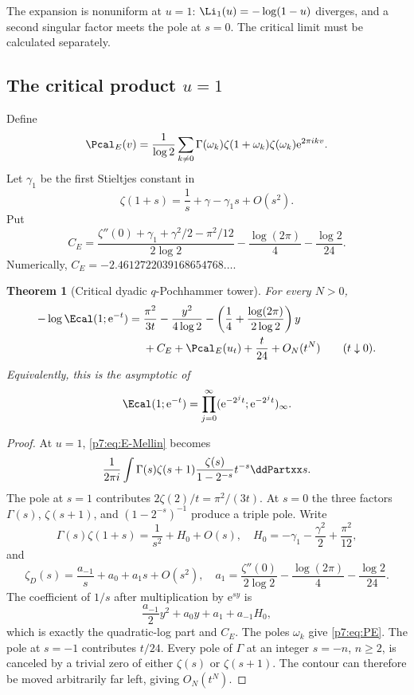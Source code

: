 \documentclass[11pt]{article}
\numberwithin{equation}{section}
\newtheorem{theorem}{Theorem}[section]
\theoremstyle{definition}
\theoremstyle{remark}
\newcommand{\e}{\mathrm e}
\begin{document}
The expansion is nonuniform at $u=1$: $\Li_1(u)=-\log(1-u)$ diverges, and a second singular factor meets the pole at $s=0$.  The critical limit must be calculated separately.

\subsection{The critical product $u=1$}

Define
\begin{equation}\label{p7:eq:PE}
 \Pcal_E(v)=\frac1{\log2}
 \sum_{k\ne0}\Gamma(\omega_k)\zeta(1+\omega_k)
 \zeta(\omega_k)\e^{2\pi ikv}.
\end{equation}
Let $\gamma_1$ be the first Stieltjes constant in
\[
 \zeta(1+s)=\frac1s+\gamma-\gamma_1s+O(s^2).
\]
Put
\begin{equation}\label{p7:eq:CE}
 C_E=
 \frac{\zeta''(0)+\gamma_1+\gamma^2/2-\pi^2/12}{2\log2}
 -\frac{\log(2\pi)}4-\frac{\log2}{24}.
\end{equation}
Numerically, $C_E=-2.4612722039168654768\ldots$.

\begin{theorem}[Critical dyadic $q$-Pochhammer tower]\label{p7:thm:E-critical}
For every $N>0$,
\begin{align}\label{p7:eq:E-critical-asymp}
 -\log\Ecal(1;\e^{-t})
 ={}&\frac{\pi^2}{3t}
 -\frac{y^2}{4\log2}
 -\left(\frac14+\frac{\log(2\pi)}{2\log2}\right)y\\
 &+C_E+\Pcal_E(u_t)+\frac{t}{24}+O_N(t^N)
 \qquad(t\downarrow0).\notag
\end{align}
Equivalently, this is the asymptotic of
\begin{equation}\label{p7:eq:E1-tower}
 \Ecal(1;\e^{-t})
 =\prod_{j=0}^{\infty}
 (\e^{-2^jt};\e^{-2^jt})_\infty.
\end{equation}
\end{theorem}

\begin{proof}
At $u=1$, \cref{p7:eq:E-Mellin} becomes
\[
 \frac1{2\pi i}\int
 \Gamma(s)\zeta(s+1)\frac{\zeta(s)}{1-2^{-s}}t^{-s}\ddPartxx s.
\]
The pole at $s=1$ contributes $2\zeta(2)/t=\pi^2/(3t)$.  At $s=0$ the three factors $\Gamma(s)$, $\zeta(s+1)$, and $(1-2^{-s})^{-1}$ produce a triple pole.  Write
\[
 \Gamma(s)\zeta(1+s)
 =\frac1{s^2}+H_0+O(s),
 \quad
 H_0=-\gamma_1-\frac{\gamma^2}{2}+\frac{\pi^2}{12},
\]
and
\[
 \zeta_D(s)=\frac{a_{-1}}s+a_0+a_1s+O(s^2),
 \quad
 a_1=\frac{\zeta''(0)}{2\log2}
 -\frac{\log(2\pi)}4-\frac{\log2}{24}.
\]
The coefficient of $1/s$ after multiplication by $\e^{sy}$ is
\[
 \frac{a_{-1}}2y^2+a_0y+a_1+a_{-1}H_0,
\]
which is exactly the quadratic-log part and $C_E$.  The poles $\omega_k$ give \cref{p7:eq:PE}.  The pole at $s=-1$ contributes $t/24$.  Every pole of $\Gamma$ at an integer $s=-n$, $n\ge2$, is canceled by a trivial zero of either $\zeta(s)$ or $\zeta(s+1)$.  The contour can therefore be moved arbitrarily far left, giving $O_N(t^N)$.
\end{proof}
\end{document}
